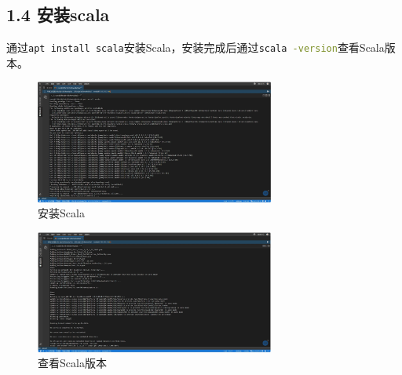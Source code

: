 \documentclass{article}
\begin{document}
\subsection*{1.4 安装scala}
通过\lstinline[language=bash]|apt install scala|安装Scala，安装完成后通过\lstinline[language=bash]|scala -version|查看Scala版本。
\begin{figure}[H]
    \centering
    \includegraphics[width=0.7\textwidth]{./pic/13.jpg}
    \caption{安装Scala}
\end{figure}
\begin{figure}[H]
    \centering
    \includegraphics[width=0.7\textwidth]{./pic/14.jpg}
    \caption{查看Scala版本}
\end{figure}
\end{document}
